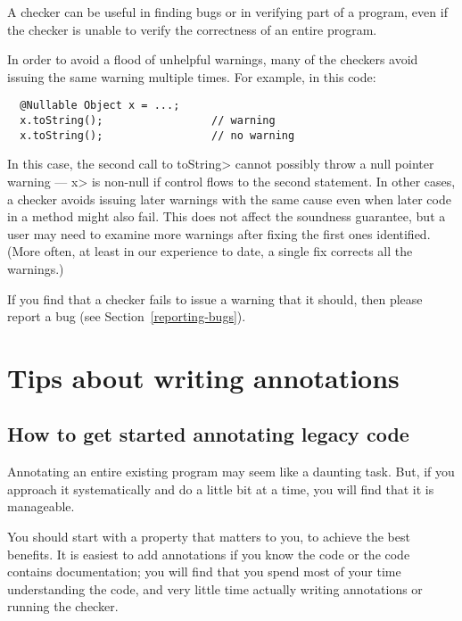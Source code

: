 A checker can be useful in finding bugs or in verifying part of a
program, even if the checker is unable to verify the correctness of an
entire program.

In order to avoid a flood of unhelpful warnings, many of the checkers avoid
issuing the same warning multiple times.  For example, in this code:

\begin{Verbatim}
  @Nullable Object x = ...;
  x.toString();                 // warning
  x.toString();                 // no warning
\end{Verbatim}

\noindent
In this case, the second call to \<toString> cannot possibly throw a null
pointer warning --- \<x> is non-null if control flows to the second
statement.
In other cases, a checker avoids issuing later warnings with the same cause
even when later code in a method might also fail.
This does not
affect the soundness guarantee, but a user may need to examine more
warnings after fixing the first ones identified.  (More often, at least in
our experience to date, a single fix corrects all the warnings.)


If you find that a checker fails to issue a warning that it
should, then please report a bug (see Section~\ref{reporting-bugs}).


\section{Tips about writing annotations\label{tips-about-writing-annotations}}


\subsection{How to get started annotating legacy code\label{get-started-with-legacy-code}}

Annotating an entire existing program may seem like a daunting task.  But,
if you approach it systematically and do a little bit at a time, you will
find that it is manageable.

You should start with a property that matters to you, to achieve the best
benefits.  It is easiest to add annotations if you know the code or the
code contains documentation; you will find that you spend most of your time
understanding the code, and very little time actually writing annotations
or running the checker.

